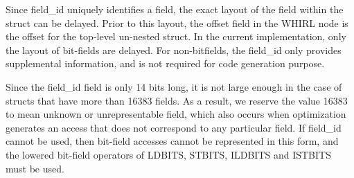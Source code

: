 \documentclass{article}
\begin{document}
Since field\_id uniquely identifies a field, the exact layout of
the field within the struct can be delayed. Prior to this layout,
the offset field in the WHIRL node is the offset for the top-level
un-nested struct. In the current implementation, only the layout of
bit-fields are delayed. For non-bitfields, the field\_id only provides
supplemental information, and is not required for code generation
purpose.

Since the field\_id field is only 14 bits long, it is not large
enough in the case of structs that have more than 16383 fields. As
a result, we reserve the value 16383 to mean unknown or unrepresentable
field, which also occurs when optimization generates an access that
does not correspond to any particular field. If field\_id cannot be
used, then bit-field accesses cannot be represented in this form,
and the lowered bit-field operators of
%
LDBITS,
%
STBITS,
%
ILDBITS and
%
ISTBITS must be used.
\end{document}
